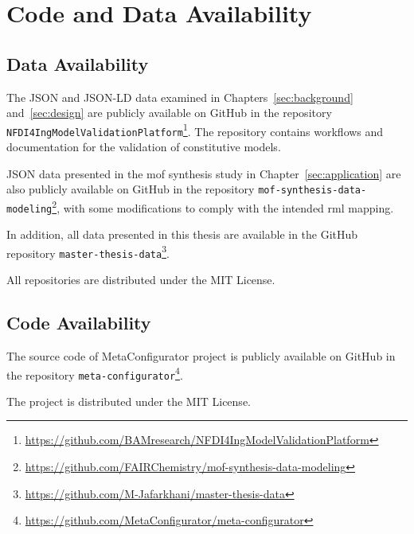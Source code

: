 \chapter{Code and Data Availability}\label{sec:code_and_data}

\section{Data Availability}

The JSON and JSON-LD data examined in Chapters~\ref{sec:background} and~\ref{sec:design} are publicly available on GitHub in the repository \texttt{NFDI4IngModelValidationPlatform}\footnote{\url{https://github.com/BAMresearch/NFDI4IngModelValidationPlatform}}.
The repository contains workflows and documentation for the validation of constitutive models.

JSON data presented in the \gls{mof} synthesis study in Chapter~\ref{sec:application} are also publicly available on GitHub in the repository \texttt{mof-synthesis-data-modeling}\footnote{\url{https://github.com/FAIRChemistry/mof-synthesis-data-modeling}}, with some modifications to comply with the intended \gls{rml} mapping.

In addition, all data presented in this thesis are available in the GitHub repository \texttt{master-thesis-data}\footnote{\url{https://github.com/M-Jafarkhani/master-thesis-data}}.

All repositories are distributed under the MIT License.

\section{Code Availability}

The source code of MetaConfigurator project is publicly available on GitHub in the repository \texttt{meta-configurator}\footnote{\url{https://github.com/MetaConfigurator/meta-configurator}}.

The project is distributed under the MIT License.
